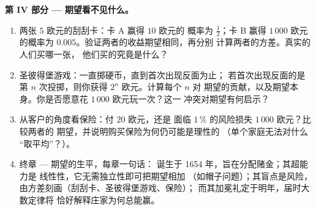 \begin{problem}
\medskip
\noindent\textbf{第 IV 部分 --- 期望看不见什么。}
\begin{enumerate}[resume]
  \item 两张 $5$ 欧元的刮刮卡：卡 A 赢得 $10$ 欧元的
        概率为 $\frac12$；卡 B 赢得 $1\,000$ 欧元的概率为
        $0.005$。验证两者的收益期望相同，再分别
        计算两者的方差。真实的人们买哪一张，
        他们买的究竟是什么？
  \item 圣彼得堡游戏：一直掷硬币，直到首次出现反面为止；
        若首次出现反面的是第 $n$ 次投掷，则你获得
        $2^n$ 欧元。计算每个 $n$ 对
        期望的贡献，以及期望本身。你是否愿意花
        $1\,000$ 欧元玩一次？这一
        冲突对期望有何启示？
  \item 从客户的角度看保险：付 $20$ 欧元，还是
        面临 $1\,\%$ 的风险损失 $1\,000$ 欧元？比较两者的
        期望，并说明购买保险为何仍可能是理性的
        （单个家庭无法对什么
        “取平均”？）。
  \item 终章 --- 期望的生平，每章一句话：
        诞生于 1654 年，旨在分配赌金；其超能力是
        线性性，它无需独立性即可把期望相加
        （如帽子问题）；其盲点是风险，
        由方差刻画（刮刮卡、圣彼得堡游戏、保险）；
        而其加冕礼定于明年，届时大数定律将
        恰好解释庄家为何总能赢。
\end{enumerate}
\end{problem}

